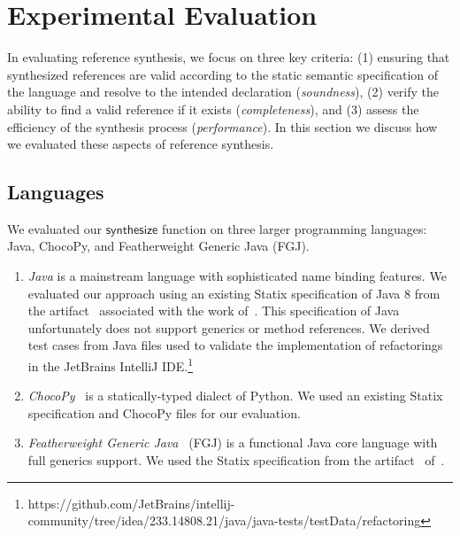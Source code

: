 \section{Experimental Evaluation}%
\label{sec:evaluation}

In evaluating reference synthesis, we focus on three key criteria: (1) ensuring that synthesized references are valid according to the static semantic specification of the language and resolve to the intended declaration (\emph{soundness}), (2) verify the ability to find a valid reference if it exists (\emph{completeness}), and (3) assess the efficiency of the synthesis process (\emph{performance}).
In this section we discuss how we evaluated these aspects of reference synthesis.

%   

\pagebreak[4]
\subsection{Languages}
We evaluated our $\mathsf{synthesize}$ function on three larger programming languages: Java, ChocoPy, and Featherweight Generic Java (FGJ).

\begin{enumerate}
  \item \emph{Java} is a mainstream language with sophisticated name binding features.
  We evaluated our approach using an existing Statix specification of Java 8 from the artifact~\cite{AntwerpenV21-artifact} associated with the work of~\citet{AntwerpenV21}.
  This specification of Java unfortunately does not support generics or method references.
  We derived test cases from Java files used to validate the implementation of refactorings in the JetBrains IntelliJ IDE.\footnote{https://github.com/JetBrains/intellij-community/tree/idea/233.14808.21/java/java-tests/testData/refactoring}
  
  \item \emph{ChocoPy}~\cite{PhadyeSH19-SPLASHE} is a statically-typed dialect of Python.
  We used an existing Statix specification and ChocoPy files for our evaluation.
  
  \item \emph{Featherweight Generic Java}~\cite{IgarashiPW01} (FGJ) is a functional Java core language with full generics support.
  We used the Statix specification from the artifact~\cite{AntwerpenPRV18-artifact} of~\citet{AntwerpenPRV18}.
\end{enumerate}


